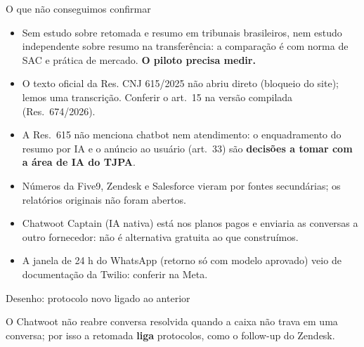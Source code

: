 \documentclass[aspectratio=169,10pt]{beamer}
\newcommand{\code}[1]{\texttt{\detokenize{#1}}}
\begin{document}
\begin{frame}{O que não conseguimos confirmar}
\begin{itemize}\setlength\itemsep{5pt}\small
  \item \alert{Sem estudo} sobre retomada e resumo em tribunais brasileiros, nem estudo independente sobre resumo na transferência: a comparação é com norma de SAC e prática de mercado. \textbf{O piloto precisa medir.}
  \item O texto oficial da Res. CNJ 615/2025 não abriu direto (bloqueio do site); lemos uma transcrição. Conferir o art.~15 na versão compilada (Res.~674/2026).
  \item A Res.~615 não menciona chatbot nem atendimento: o enquadramento do resumo por IA e o anúncio ao usuário (art.~33) são \textbf{decisões a tomar com a área de IA do TJPA}.
  \item Números da Five9, Zendesk e Salesforce vieram por fontes secundárias; os relatórios originais não foram abertos.
  \item Chatwoot Captain (IA nativa) está nos planos pagos e enviaria as conversas a outro fornecedor: não é alternativa gratuita ao que construímos.
  \item A janela de 24 h do WhatsApp (retorno só com modelo aprovado) veio de documentação da Twilio: conferir na Meta.
\end{itemize}
\end{frame}

\begin{frame}{Desenho: protocolo novo ligado ao anterior}
\centering
{}
\vskip8pt
{\scriptsize O Chatwoot não reabre conversa resolvida quando a caixa não trava em uma conversa; por isso a retomada \textbf{liga} protocolos, como o follow-up do Zendesk.}
\end{frame}
\end{document}
